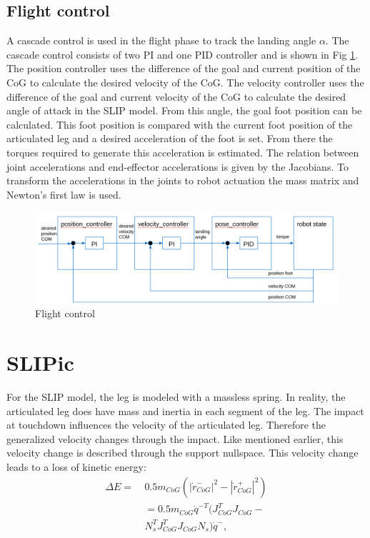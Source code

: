 \documentclass[journal,onecolumn]{IEEEtran}
\begin{document}
	\subsection{Flight control}
	A cascade control is used in the flight phase to track the landing angle \(\alpha\). The cascade control consists of two PI and one PID controller and is shown in Fig \ref{fig:cascade}. 
	The position controller uses the difference of the goal and current position of the CoG to calculate the desired velocity of the CoG. The velocity controller uses 
	the difference of the goal and current velocity of the CoG to calculate the desired angle of attack in the SLIP model. From this angle, the goal foot position can be 
	calculated. This foot position is compared with the current foot position of the articulated leg and a desired acceleration of the foot is set. From there the torques 
	required to generate this acceleration is estimated. The relation between joint accelerations and end-effector accelerations is given by the 
	Jacobians. To transform the accelerations in the joints to robot actuation the mass matrix and Newton's first law is used.
	
	\begin{figure}[h]
		\centering
		\includegraphics[scale=0.11]{"assets/cascade.png"}
		\caption{Flight control}
		\label{fig:cascade}
	\end{figure}
	
	\section{SLIPic}
	\label{sec:SLIPic}
	For the SLIP model, the leg is modeled with a massless spring. In reality, the articulated leg does have mass and inertia in each segment of the leg. 
	The impact at touchdown influences the velocity of the articulated leg. Therefore the generalized velocity changes through the impact. 
	Like mentioned earlier, this velocity change is described through the support nullspace. This velocity change leads to a loss of kinetic energy:
	\begin{equation}
	\begin{aligned}
	\Delta E = & \ 0.5 {m}_{CoG} ({|{\dot{r}}_{CoG}^{-}|}^{2} - {|{\dot{r}}_{CoG}^{+}|}^{2}) \\
	& \ =0.5 {m}_{CoG} {\dot{q}}^{-T} ({J}_{CoG}^{T} {J}_{CoG} - \\
	& \ {N}_{s}^{T} {J}_{CoG}^{T} {J}_{CoG} {N}_{s}) {\dot{q}}^{-},
	\end{aligned}
	\end{equation}
	
\end{document}

